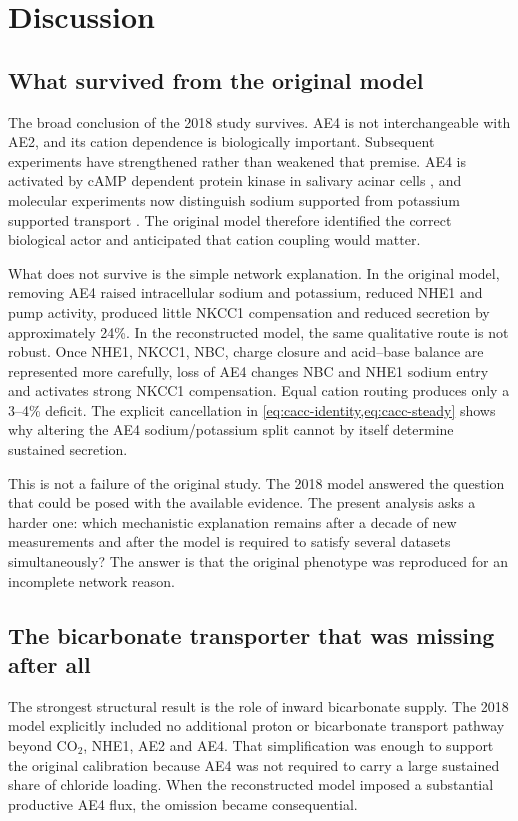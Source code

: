 \section{Discussion}
\label{sec:discussion}

\subsection{What survived from the original model}

The broad conclusion of the 2018 study survives. AE4 is not interchangeable with AE2, and its cation dependence is biologically important. Subsequent experiments have strengthened rather than weakened that premise. AE4 is activated by cAMP dependent protein kinase in salivary acinar cells \citep{PenaMunzenmayer2021}, and molecular experiments now distinguish sodium supported from potassium supported transport \citep{Catalan2025}. The original model therefore identified the correct biological actor and anticipated that cation coupling would matter.

What does not survive is the simple network explanation. In the original model, removing AE4 raised intracellular sodium and potassium, reduced NHE1 and pump activity, produced little NKCC1 compensation and reduced secretion by approximately 24\%. In the reconstructed model, the same qualitative route is not robust. Once NHE1, NKCC1, NBC, charge closure and acid--base balance are represented more carefully, loss of AE4 changes NBC and NHE1 sodium entry and activates strong NKCC1 compensation. Equal cation routing produces only a 3--4\% deficit. The explicit cancellation in \cref{eq:cacc-identity,eq:cacc-steady} shows why altering the AE4 sodium/potassium split cannot by itself determine sustained secretion.

This is not a failure of the original study. The 2018 model answered the question that could be posed with the available evidence. The present analysis asks a harder one: which mechanistic explanation remains after a decade of new measurements and after the model is required to satisfy several datasets simultaneously? The answer is that the original phenotype was reproduced for an incomplete network reason.

\subsection{The bicarbonate transporter that was missing after all}

The strongest structural result is the role of inward bicarbonate supply. The 2018 model explicitly included no additional proton or bicarbonate transport pathway beyond CO$_2$, NHE1, AE2 and AE4. That simplification was enough to support the original calibration because AE4 was not required to carry a large sustained share of chloride loading. When the reconstructed model imposed a substantial productive AE4 flux, the omission became consequential.

